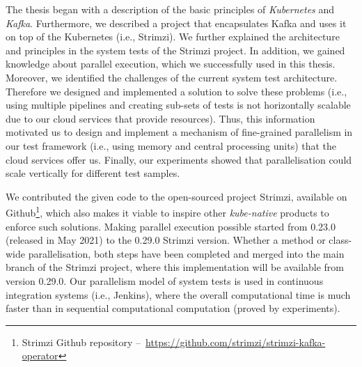The thesis began with a description of the basic principles of \emph{Kubernetes} and \emph{Kafka}.
Furthermore, we described a project that encapsulates Kafka and uses it on top of the Kubernetes (i.e., Strimzi).
We further explained the architecture and principles in the system tests of the Strimzi project.
In addition, we gained knowledge about parallel execution, which we successfully used in this thesis.
Moreover, we identified the challenges of the current system test architecture.
Therefore we designed and implemented a solution to solve these problems (i.e., using multiple pipelines and creating sub-sets of
tests is not horizontally scalable due to our cloud services that provide resources).
Thus, this information motivated us to design and implement a mechanism of fine-grained parallelism in our test framework (i.e., using memory and central processing units) that the cloud services offer us.
Finally, our experiments showed that parallelisation could scale vertically for different test samples.

We contributed the given code to the open-sourced project Strimzi, available on
Github\footnote{Strimzi Github repository \---\ \url{https://github.com/strimzi/strimzi-kafka-operator}},
which also makes it viable to inspire other \emph{kube-native} products to enforce such solutions.
Making parallel execution possible started from 0.23.0 (released in May 2021) to the 0.29.0 Strimzi version.
Whether a method or class-wide parallelisation, both steps have been completed and merged into the main branch of
the Strimzi project, where this implementation will be available from version 0.29.0.
Our parallelism model of system tests is used in continuous integration systems (i.e., Jenkins), where the overall computational time is much faster than in sequential computational computation (proved by experiments).